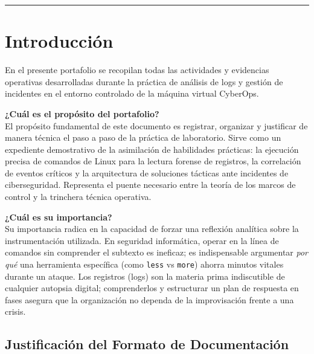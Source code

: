 \documentclass[12pt,a4paper]{article}
\begin{document}
\vspace{0.8cm}
\noindent\rule{\textwidth}{0.4pt}

\newpage


\renewcommand*\contentsname{Índice}
\tableofcontents
\newpage

\section{Introducción}

En el presente portafolio se recopilan todas las actividades y evidencias operativas desarrolladas durante la práctica de análisis de logs y gestión de incidentes en el entorno controlado de la máquina virtual CyberOps.

\textbf{¿Cuál es el propósito del portafolio?}\\
El propósito fundamental de este documento es registrar, organizar y justificar de manera técnica el paso a paso de la práctica de laboratorio. Sirve como un expediente demostrativo de la asimilación de habilidades prácticas: la ejecución precisa de comandos de Linux para la lectura forense de registros, la correlación de eventos críticos y la arquitectura de soluciones tácticas ante incidentes de ciberseguridad. Representa el puente necesario entre la teoría de los marcos de control y la trinchera técnica operativa.

\textbf{¿Cuál es su importancia?}\\
Su importancia radica en la capacidad de forzar una reflexión analítica sobre la instrumentación utilizada. En seguridad informática, operar en la línea de comandos sin comprender el subtexto es ineficaz; es indispensable argumentar \textit{por qué} una herramienta específica (como \texttt{less} vs \texttt{more}) ahorra minutos vitales durante un ataque. Los registros (logs) son la materia prima indiscutible de cualquier autopsia digital; comprenderlos y estructurar un plan de respuesta en fases asegura que la organización no dependa de la improvisación frente a una crisis.

\subsection*{Justificación del Formato de Documentación}
\end{document}
